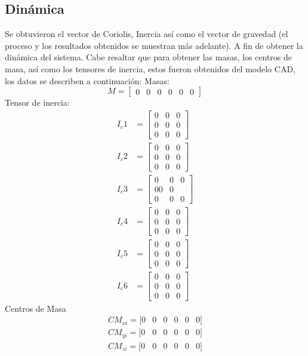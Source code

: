 \subsection{Dinámica}
Se obtuvieron el vector de Coriolis, Inercia así como el vector de gravedad (el proceso y los resultados obtenidos se
muestran más adelante). A fin de obtener la dinámica del sistema.
Cabe resaltar que para obtener las masas, los centros de masa, así como los tensores de inercia, estos fueron obtenidos
del modelo CAD, los datos se describen a continuación: 
Masas:
\begin{equation*}
    M = \begin{bmatrix} 0 & 0 & 0 & 0 & 0 & 0 \end{bmatrix}
\end{equation*}
Tensor de inercia: 
\begin{align*}
I_c{1} & =\begin{bmatrix}
0 &	0 &	0 \\ 0 &	0 &	0 \\
0 &	0 &	0\end{bmatrix} \\
I_c{2} & =\begin{bmatrix}
0 &	0 &	0    \\
0  &	0 &	0 \\
0	& 0 &	0\end{bmatrix} \\
I_c{3} & =\begin{bmatrix}
0 &	0	& 0 \\0	0 & 0 \\
0 & 0 & 0\end{bmatrix}\\
I_c{4} & =\begin{bmatrix}
0 &	0 & 0 \\
0 & 0 &	0\\
0 & 0 &	0\end{bmatrix}\\
I_c{5} & =\begin{bmatrix}
0 &	0 & 0\\
0 &	0 & 0\\ 
0 & 0 & 0\end{bmatrix}\\
I_c{6} & =\begin{bmatrix}
0 &	0 & 0\\
0 &	0 & 0\\ 
0 & 0 & 0\end{bmatrix}
\end{align*}
Centros de Masa 
\begin{align*}
CM_{xi}=[0 & 0 & 0 & 0 & 0 & 0]\\
CM_{yi}=[0 & 0 & 0 & 0 & 0 & 0]\\
CM_{zi}=[0 & 0 & 0 & 0 & 0 & 0]\\
\end{align*}


